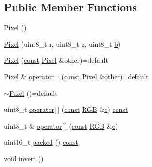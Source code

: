 \subsection*{Public Member Functions}
\begin{DoxyCompactItemize}
\item 
\hyperlink{class_pixel_a27ad99a2f705e635c42d242d530d4756}{Pixel} ()
\item 
\hyperlink{class_pixel_acfc5df218e6b318edcb09cdf6727c529}{Pixel} (uint8\+\_\+t r, uint8\+\_\+t g, uint8\+\_\+t \hyperlink{jquery_8js_a2fa551895933fae935a0a6b87282241d}{b})
\item 
\hyperlink{class_pixel_a787fa2f52c2c61b3ad51a0ffe80b6a25}{Pixel} (\hyperlink{functions__c_8js_afacfd9c985d225bb07483b887a801b6f}{const} \hyperlink{class_pixel}{Pixel} \&other)=default
\item 
\hyperlink{class_pixel}{Pixel} \& \hyperlink{class_pixel_ac00753b6afb5bf23405c18f1be0ba7b8}{operator=} (\hyperlink{functions__c_8js_afacfd9c985d225bb07483b887a801b6f}{const} \hyperlink{class_pixel}{Pixel} \&other)=default
\item 
\hyperlink{class_pixel_a7e61f60b067f67b75eda2b31bdb7331b}{$\sim$\+Pixel} ()=default
\item 
uint8\+\_\+t \hyperlink{class_pixel_a53aaf31ca813603015645ed426c0e773}{operator\mbox{[}$\,$\mbox{]}} (\hyperlink{functions__c_8js_afacfd9c985d225bb07483b887a801b6f}{const} \hyperlink{class_pixel_ac2ab5194684b31a50d429b26a0569ed9}{R\+GB} \&\hyperlink{functions__f_8js_aadfd49790b56c82605242ff3896447ed}{c}) \hyperlink{functions__c_8js_afacfd9c985d225bb07483b887a801b6f}{const} 
\item 
uint8\+\_\+t \& \hyperlink{class_pixel_aee26e313f33828aad54775818acb7f4e}{operator\mbox{[}$\,$\mbox{]}} (\hyperlink{functions__c_8js_afacfd9c985d225bb07483b887a801b6f}{const} \hyperlink{class_pixel_ac2ab5194684b31a50d429b26a0569ed9}{R\+GB} \&\hyperlink{functions__f_8js_aadfd49790b56c82605242ff3896447ed}{c})
\item 
uint16\+\_\+t \hyperlink{class_pixel_a3fb07455636711f0be6bcc293e244482}{packed} () \hyperlink{functions__c_8js_afacfd9c985d225bb07483b887a801b6f}{const} 
\item 
void \hyperlink{class_pixel_a1159eae28181f9bd41ac10833122a7d2}{invert} ()
\end{DoxyCompactItemize}

